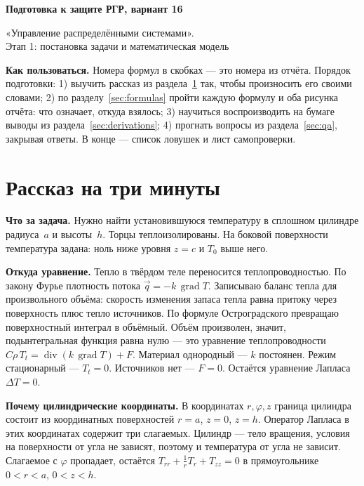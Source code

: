\documentclass[a4paper,12pt]{article}
\DeclareMathOperator{\Div}{div}
\DeclareMathOperator{\Grad}{grad}
\newcounter{qa}
\begin{document}
\begin{center}
  {\Large\bfseries Подготовка к защите РГР, вариант 16\par}
  \vspace{4pt}
  {\large «Управление распределёнными системами».\\
   Этап 1: постановка задачи и математическая модель\par}
\end{center}

\textbf{Как пользоваться.} Номера формул в скобках — это номера из отчёта.
Порядок подготовки: 1) выучить рассказ из раздела~\ref{sec:story} так, чтобы
произносить его своими словами; 2) по разделу~\ref{sec:formulas} пройти
каждую формулу и оба рисунка отчёта: что означает, откуда взялось;
3) научиться воспроизводить на бумаге выводы из раздела~\ref{sec:derivations};
4) прогнать вопросы из раздела~\ref{sec:qa}, закрывая ответы. В конце —
список ловушек и лист самопроверки.

\tableofcontents

\section{Рассказ на три минуты}
\label{sec:story}

\textbf{Что за задача.} Нужно найти установившуюся температуру в сплошном
цилиндре радиуса~$a$ и высоты~$h$. Торцы теплоизолированы. На боковой
поверхности температура задана: ноль ниже уровня $z=c$ и $T_0$ выше него.

\textbf{Откуда уравнение.} Тепло в твёрдом теле переносится
теплопроводностью. По закону Фурье плотность потока $\vec q=-k\,\Grad T$.
Записываю баланс тепла для произвольного объёма: скорость изменения запаса
тепла равна притоку через поверхность плюс тепло источников. По формуле
Остроградского превращаю поверхностный интеграл в объёмный. Объём
произволен, значит, подынтегральная функция равна нулю — это уравнение
теплопроводности $C\rho\,T_t=\Div(k\,\Grad T)+F$. Материал однородный —
$k$ постоянен. Режим стационарный — $T_t=0$. Источников нет — $F=0$.
Остаётся уравнение Лапласа $\Delta T=0$.

\textbf{Почему цилиндрические координаты.} В координатах $r,\varphi,z$
граница цилиндра состоит из координатных поверхностей $r=a$, $z=0$, $z=h$.
Оператор Лапласа в этих координатах содержит три слагаемых. Цилиндр — тело
вращения, условия на поверхности от угла не зависят, поэтому и температура
от угла не зависит. Слагаемое с $\varphi$ пропадает, остаётся
$T_{rr}+\frac1r T_r+T_{zz}=0$ в прямоугольнике $0<r<a$, $0<z<h$.
\end{document}
